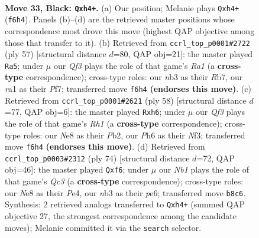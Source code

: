 \documentclass[11pt]{article}
\begin{document}
\clearpage

\begin{figure}[p]\centering
\begin{subfigure}{0.46\textwidth}\centering
\resizebox{\linewidth}{!}{%
\newchessgame
\chessboard[
  setfen={rn2nk2/1Q5p/5q1p/p1P2p1P/P6P/1N6/7K/RN6 b - - 0 33},
  showmover=false,
  pgfstyle=straightmove, color=movearrow, markmove={f6-h4}
]}
\caption{}
\end{subfigure}\hfill
\begin{subfigure}{0.46\textwidth}\centering
\resizebox{\linewidth}{!}{%
\newchessgame
\chessboard[
  setfen={r5k1/1r1n1pp1/3Q4/2p5/3pqN1P/6P1/3RPP1K/2R5 b - - 3 29},
  showmover=false,
  pgfstyle=straightmove, color=movearrow, markmove={a8-a5}
]}
\caption{}
\end{subfigure}
\\[4pt]
\begin{subfigure}{0.46\textwidth}\centering
\resizebox{\linewidth}{!}{%
\newchessgame
\chessboard[
  setfen={3r2k1/5p2/1n2p2p/2q1P3/8/1Q3N2/1P3PP1/1K5R w - - 0 30},
  showmover=false,
  pgfstyle=straightmove, color=movearrow, markmove={h1-h6}
]}
\caption{}
\end{subfigure}\hfill
\begin{subfigure}{0.46\textwidth}\centering
\resizebox{\linewidth}{!}{%
\newchessgame
\chessboard[
  setfen={4k3/8/p2ppb1p/1p6/4PNq1/PPQ2R2/K1P5/3r4 w - - 5 38},
  showmover=false,
  pgfstyle=straightmove, color=movearrow, markmove={c3-f6}
]}
\caption{}
\end{subfigure}
\caption{\textbf{Move 33, Black: \texttt{Qxh4+}.} (a) Our position; Melanie plays \texttt{Qxh4+} (\texttt{f6h4}). Panels (b)--(d) are the retrieved master positions whose correspondence most drove this move (highest QAP objective among those that transfer to it). (b) Retrieved from \texttt{ccrl\_top\_p0001\#2722} (ply 57) [structural distance $d$=80, QAP obj=21]: the master played \texttt{Ra5}; under $\mu$ our \emph{Qf3} plays the role of that game's \emph{Ra1} (a \textbf{cross-type} correspondence); cross-type roles: our \emph{n}b3 as their \emph{R}b7, our \emph{r}a1 as their \emph{P}f7; transferred move \texttt{f6h4} \textbf{(endorses this move)}. (c) Retrieved from \texttt{ccrl\_top\_p0001\#2621} (ply 58) [structural distance $d$=77, QAP obj=6]: the master played \texttt{Rxh6}; under $\mu$ our \emph{Qf3} plays the role of that game's \emph{Rh1} (a \textbf{cross-type} correspondence); cross-type roles: our \emph{N}e8 as their \emph{P}b2, our \emph{P}h6 as their \emph{N}f3; transferred move \texttt{f6h4} \textbf{(endorses this move)}. (d) Retrieved from \texttt{ccrl\_top\_p0003\#2312} (ply 74) [structural distance $d$=72, QAP obj=46]: the master played \texttt{Qxf6}; under $\mu$ our \emph{Nb1} plays the role of that game's \emph{Qc3} (a \textbf{cross-type} correspondence); cross-type roles: our \emph{N}e8 as their \emph{P}e4, our \emph{n}b3 as their \emph{p}e6; transferred move \texttt{b8c6}. Synthesis: 2 retrieved analogs transferred to \texttt{Qxh4+} (summed QAP objective 27, the strongest correspondence among the candidate moves); Melanie committed it via the \texttt{search} selector.}
\label{fig:thought-m65}
\end{figure}
\end{document}

